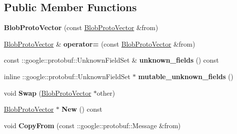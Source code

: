 \subsection*{Public Member Functions}
\begin{DoxyCompactItemize}
\item 
\mbox{\label{classcaffe_1_1_blob_proto_vector_aa6e9a4f4d896f00f229ad3030601e340}} 
{\bfseries Blob\+Proto\+Vector} (const \mbox{\hyperlink{classcaffe_1_1_blob_proto_vector}{Blob\+Proto\+Vector}} \&from)
\item 
\mbox{\label{classcaffe_1_1_blob_proto_vector_a9e27131cc492c9aaeaa38fb8126936ae}} 
\mbox{\hyperlink{classcaffe_1_1_blob_proto_vector}{Blob\+Proto\+Vector}} \& {\bfseries operator=} (const \mbox{\hyperlink{classcaffe_1_1_blob_proto_vector}{Blob\+Proto\+Vector}} \&from)
\item 
\mbox{\label{classcaffe_1_1_blob_proto_vector_a6cfa159b7cf3e3b80a06fe8d7607984c}} 
const \+::google\+::protobuf\+::\+Unknown\+Field\+Set \& {\bfseries unknown\+\_\+fields} () const
\item 
\mbox{\label{classcaffe_1_1_blob_proto_vector_af35d4c83a70b072dff3a797d166bb950}} 
inline \+::google\+::protobuf\+::\+Unknown\+Field\+Set $\ast$ {\bfseries mutable\+\_\+unknown\+\_\+fields} ()
\item 
\mbox{\label{classcaffe_1_1_blob_proto_vector_a788b3a63d8f9eda6e3f3d29141bb6ac7}} 
void {\bfseries Swap} (\mbox{\hyperlink{classcaffe_1_1_blob_proto_vector}{Blob\+Proto\+Vector}} $\ast$other)
\item 
\mbox{\label{classcaffe_1_1_blob_proto_vector_a2c51f0ead45d79cb5b1b53b098621b48}} 
\mbox{\hyperlink{classcaffe_1_1_blob_proto_vector}{Blob\+Proto\+Vector}} $\ast$ {\bfseries New} () const
\item 
\mbox{\label{classcaffe_1_1_blob_proto_vector_af473f29a9221698c05e5e5ff991856dd}} 
void {\bfseries Copy\+From} (const \+::google\+::protobuf\+::\+Message \&from)
\item 
\mbox{\label{classcaffe_1_1_blob_proto_vector_aff32f9ed8ead8853633a095a1f31ff04}} 

\end{DoxyCompactItemize}
